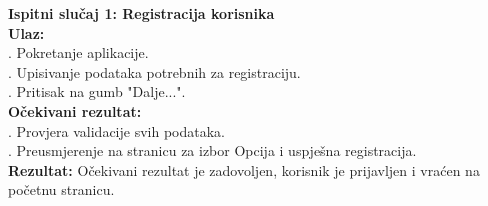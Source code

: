 \documentclass[times, utf8, zavrsni]{fer}
\begin{document}
		\noindent \textbf{Ispitni slučaj 1: Registracija korisnika}\\
			\textbf{Ulaz:}\\
			    . Pokretanje aplikacije.\\
			    . Upisivanje podataka potrebnih za registraciju.\\
			    . Pritisak na gumb "Dalje...".\\
			   
			\noindent\textbf{Očekivani rezultat:}\\
			    . Provjera validacije svih podataka.\\
			    . Preusmjerenje na stranicu za izbor Opcija i uspješna registracija.\\
			    
			\noindent\textbf{Rezultat:}
			    \noindent Očekivani rezultat je zadovoljen, korisnik je prijavljen i vraćen na početnu stranicu.
			    
\end{document}
